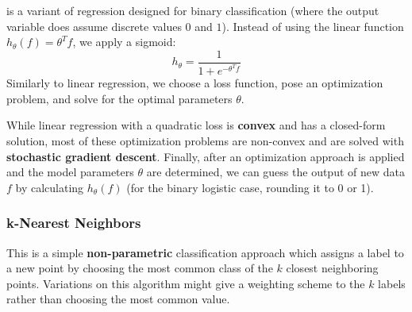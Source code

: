 \documentclass[11pt]{article}
\begin{document}
 is a variant of regression designed for binary classification (where the output variable does assume discrete values $0$ and $1$). Instead of using the linear function $h_{\theta}(f) = \theta^T f$, we apply a sigmoid:
\[
h_{\theta} = \frac{1}{1 + e^{-\theta^T f}}
\]
Similarly to linear regression, we choose a loss function, pose an optimization problem, and solve for the optimal parameters $\theta$. 

\noindent While linear regression with a quadratic loss is {\bf{convex}} and has a closed-form solution, most of these optimization problems are non-convex and are solved with {\bf{stochastic gradient descent}}. Finally, after an optimization approach is applied and the model parameters $\theta$ are determined, we can guess the output of new data $f$ by calculating $h_{\theta}(f)$ (for the binary logistic case, rounding it to 0 or 1).

\subsubsection*{k-Nearest Neighbors}
This is a simple {\bf{non-parametric}} classification approach which assigns a label to a new point by choosing the most common class of the $k$ closest neighboring points. Variations on this algorithm might give a weighting scheme to the $k$ labels rather than choosing the most common value. 
\end{document}
